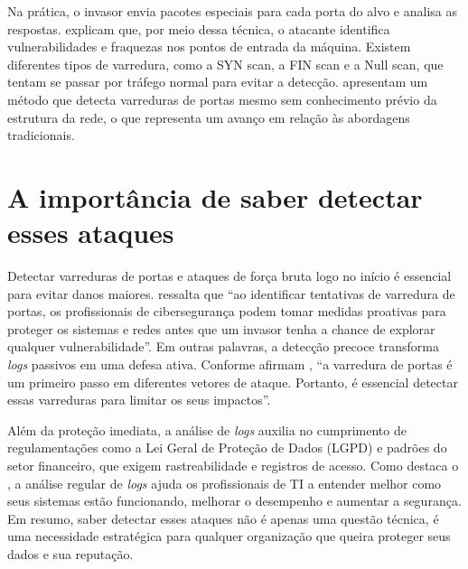\documentclass[
    12pt
    ,oneside
    ,a4paper
    ,chapter=TITLE
    ,section=TITLE
    ,sumario=abnt-6027-2012]{abntex2}
\begin{document}
Na prática, o invasor envia pacotes especiais para cada porta do alvo e analisa as respostas.  explicam que, por meio dessa técnica, o atacante identifica vulnerabilidades e fraquezas nos pontos de entrada da máquina. Existem diferentes tipos de varredura, como a SYN scan, a FIN scan e a Null scan, que tentam se passar por tráfego normal para evitar a detecção.  apresentam um método que detecta varreduras de portas mesmo sem conhecimento prévio da estrutura da rede, o que representa um avanço em relação às abordagens tradicionais.

\section{A importância de saber detectar esses ataques}

Detectar varreduras de portas e ataques de força bruta logo no início é essencial para evitar danos maiores.  ressalta que “ao identificar tentativas de varredura de portas, os profissionais de cibersegurança podem tomar medidas proativas para proteger os sistemas e redes antes que um invasor tenha a chance de explorar qualquer vulnerabilidade”. Em outras palavras, a detecção precoce transforma \textit{logs} passivos em uma defesa ativa. Conforme afirmam , “a varredura de portas é um primeiro passo em diferentes vetores de ataque. Portanto, é essencial detectar essas varreduras para limitar os seus impactos”.

Além da proteção imediata, a análise de \textit{logs} auxilia no cumprimento de regulamentações como a Lei Geral de Proteção de Dados (LGPD) e padrões do setor financeiro, que exigem rastreabilidade e registros de acesso. Como destaca o , a análise regular de \textit{logs} ajuda os profissionais de TI a entender melhor como seus sistemas estão funcionando, melhorar o desempenho e aumentar a segurança. Em resumo, saber detectar esses ataques não é apenas uma questão técnica, é uma necessidade estratégica para qualquer organização que queira proteger seus dados e sua reputação.


\end{document}
